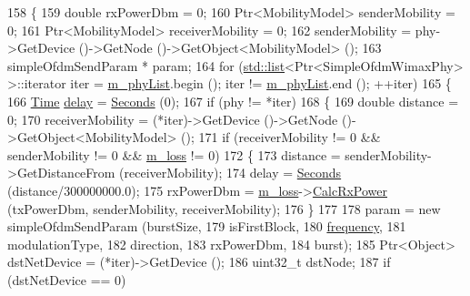 \begin{DoxyCode}
158 \{
159   \textcolor{keywordtype}{double} rxPowerDbm = 0;
160   Ptr<MobilityModel> senderMobility = 0;
161   Ptr<MobilityModel> receiverMobility = 0;
162   senderMobility = phy->GetDevice ()->GetNode ()->GetObject<MobilityModel> ();
163   simpleOfdmSendParam * param;
164   \textcolor{keywordflow}{for} (\hyperlink{openflow-interface_8h_afd9bcfa176617760671b67580f536fa7}{std::list}<Ptr<SimpleOfdmWimaxPhy> >::iterator iter = \hyperlink{classns3_1_1SimpleOfdmWimaxChannel_a94f4604c10187d0242c0545275750cda}{m\_phyList}.begin (); iter != 
      \hyperlink{classns3_1_1SimpleOfdmWimaxChannel_a94f4604c10187d0242c0545275750cda}{m\_phyList}.end (); ++iter)
165     \{
166       \hyperlink{namespacens3_1_1TracedValueCallback_a7ffd3e7c142ffe7c8a1d2db9b8de38ec}{Time} \hyperlink{lte_2model_2fading-traces_2fading__trace__generator_8m_a7964e6aa8f61a9d28973c8267a606ad8}{delay} = \hyperlink{group__timecivil_ga33c34b816f8ff6628e33d5c8e9713b9e}{Seconds} (0);
167       \textcolor{keywordflow}{if} (phy != *iter)
168         \{
169           \textcolor{keywordtype}{double} distance = 0;
170           receiverMobility = (*iter)->GetDevice ()->GetNode ()->GetObject<MobilityModel> ();
171           \textcolor{keywordflow}{if} (receiverMobility != 0 && senderMobility != 0 && \hyperlink{classns3_1_1SimpleOfdmWimaxChannel_a0f7cdabc0c8ce4957eeb63b98bf27b1a}{m\_loss} != 0)
172             \{
173               distance = senderMobility->GetDistanceFrom (receiverMobility);
174               delay =  \hyperlink{group__timecivil_ga33c34b816f8ff6628e33d5c8e9713b9e}{Seconds} (distance/300000000.0);
175               rxPowerDbm = \hyperlink{classns3_1_1SimpleOfdmWimaxChannel_a0f7cdabc0c8ce4957eeb63b98bf27b1a}{m\_loss}->\hyperlink{classns3_1_1PropagationLossModel_a8b42564e9b03e2197f17aab6692c4fee}{CalcRxPower} (txPowerDbm, senderMobility, 
      receiverMobility);
176             \}
177 
178           param = \textcolor{keyword}{new} simpleOfdmSendParam (burstSize,
179                                            isFirstBlock,
180                                            \hyperlink{lte_2model_2fading-traces_2fading__trace__generator_8m_a09045328d6d7e16aa4013f526cc6993d}{frequency},
181                                            modulationType,
182                                            direction,
183                                            rxPowerDbm,
184                                            burst);
185           Ptr<Object> dstNetDevice = (*iter)->GetDevice ();
186           uint32\_t dstNode;
187           \textcolor{keywordflow}{if} (dstNetDevice == 0)

\end{DoxyCode}
